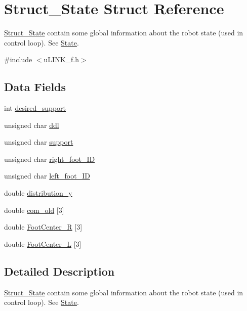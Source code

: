 \hypertarget{struct_struct___state}{\section{Struct\-\_\-\-State Struct Reference}
\label{struct_struct___state}
}


\hyperlink{struct_struct___state}{Struct\-\_\-\-State} contain some global information about the robot state (used in control loop). See \hyperlink{struct_state}{State}.  




{\ttfamily \#include $<$u\-L\-I\-N\-K\-\_\-f.\-h$>$}

\subsection*{Data Fields}
\begin{DoxyCompactItemize}
\item 
int \hyperlink{struct_struct___state_a8067647d8a7eea1d16f30f80cea4dec4}{desired\-\_\-support}
\item 
unsigned char \hyperlink{struct_struct___state_ab0f2106d30920c8378637b714a10c5cf}{ddl}
\item 
unsigned char \hyperlink{struct_struct___state_a9854989348fe32143c3c0bae57d2d21f}{support}
\item 
unsigned char \hyperlink{struct_struct___state_a6464c8fa37c44fd32cad38d5bfb8dc63}{right\-\_\-foot\-\_\-\-I\-D}
\item 
unsigned char \hyperlink{struct_struct___state_a59c50a3f7e85d2d8935b0cc17b246def}{left\-\_\-foot\-\_\-\-I\-D}
\item 
double \hyperlink{struct_struct___state_a3027c945c3ccd5eef8ef7cc5a730c231}{distribution\-\_\-y}
\item 
double \hyperlink{struct_struct___state_ada2aab0c9249b11ce1bf5be8b33b1862}{com\-\_\-old} \mbox{[}3\mbox{]}
\item 
double \hyperlink{struct_struct___state_a20b8e13992b9546e13ab927985c08783}{Foot\-Center\-\_\-\-R} \mbox{[}3\mbox{]}
\item 
double \hyperlink{struct_struct___state_a143b00e290eb82bf92bc8df93d25a90f}{Foot\-Center\-\_\-\-L} \mbox{[}3\mbox{]}
\end{DoxyCompactItemize}


\subsection{Detailed Description}
\hyperlink{struct_struct___state}{Struct\-\_\-\-State} contain some global information about the robot state (used in control loop). See \hyperlink{struct_state}{State}. 

